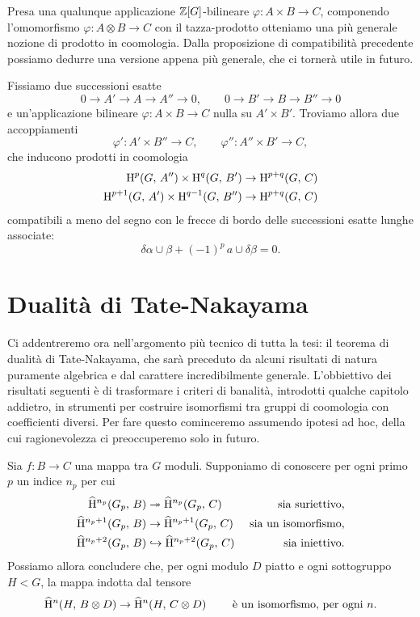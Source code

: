 Presa una qualunque applicazione $ \mathbb{Z}[G] $-bilineare $ \varphi\colon A \times B \to C $, componendo l'omomorfismo $ \varphi\colon A \otimes B \to C  $ con il tazza-prodotto otteniamo una più generale nozione di prodotto in coomologia. Dalla proposizione di compatibilità precedente possiamo dedurre una versione appena più generale, che ci tornerà utile in futuro.

\begin{lemma}\label{cup2}
	Fissiamo due successioni esatte
	\[ 0 \to A' \to A \to A'' \to 0, \qquad 0 \to B' \to B \to B'' \to 0 \]
	e un'applicazione bilineare $  \varphi\colon A \times B \to C $ nulla su $ A'\times B' $. Troviamo allora due accoppiamenti
	\[ \varphi'\colon A' \times B'' \to C, \qquad \varphi''\colon A'' \times B' \to C, \]
	che inducono prodotti in coomologia
	\begin{align*}
		\operatorname{H}^{p}(G, \, A'') \times \operatorname{H}^{q}(G, \, B') &\to \operatorname{H}^{p+q}(G, \, C)\\
		\operatorname{H}^{p+1}(G, \, A') \times \operatorname{H}^{q-1}(G, \, B'') &\to \operatorname{H}^{p+q}(G, \, C)
	\end{align*}
	compatibili a meno del segno con le frecce di bordo delle successioni esatte lunghe associate:  $$  \delta \alpha \cup \beta + (-1)^p \, a \cup \delta \beta = 0.  $$
\end{lemma}

\section{Dualità di Tate-Nakayama}
Ci addentreremo ora nell'argomento più tecnico di tutta la tesi: il teorema di dualità di Tate-Nakayama, che sarà preceduto da alcuni risultati di natura puramente algebrica e dal carattere incredibilmente generale. L'obbiettivo dei risultati seguenti è di trasformare i criteri di banalità, introdotti qualche capitolo addietro, in strumenti per costruire isomorfismi tra gruppi di coomologia con coefficienti diversi. Per fare questo cominceremo assumendo ipotesi ad hoc, della cui ragionevolezza ci preoccuperemo solo in futuro. 

\begin{proposition}
	Sia $ f \colon B \to C $ una mappa tra $ G $ moduli. Supponiamo di conoscere per ogni primo $ p $ un indice $ n_p $ per cui
	\begin{align*}
		\operatorname{\widehat{H}^{\mathnormal{n_p}}}(G_p,\, B) &\twoheadrightarrow \operatorname{\widehat{H}^{\mathnormal{n_p}}}(G_p,\, C) & \text{ sia suriettivo,} \\
		\operatorname{\widehat{H}^{\mathnormal{n_p}+1}}(G_p,\, B) &\to \operatorname{\widehat{H}^{\mathnormal{n_p}+1}}(G_p,\, C) & \text{ sia un isomorfismo,} \\
		\operatorname{\widehat{H}^{\mathnormal{n_p}+2}}(G_p,\, B) &\hookrightarrow \operatorname{\widehat{H}^{\mathnormal{n_p}+2}}(G_p,\, C) & \text{ sia iniettivo.}
	\end{align*}
	Possiamo allora concludere che, per ogni modulo $ D $ piatto e ogni sottogruppo $ H < G $, la mappa indotta dal tensore
	\[ \operatorname{\widehat{H}^{\mathnormal{n}}}(H, \, B \otimes D) \to \operatorname{\widehat{H}^{\mathnormal{n}}}(H, \, C \otimes D) \qquad\text{ è un isomorfismo, per ogni } n. \]
\end{proposition}

